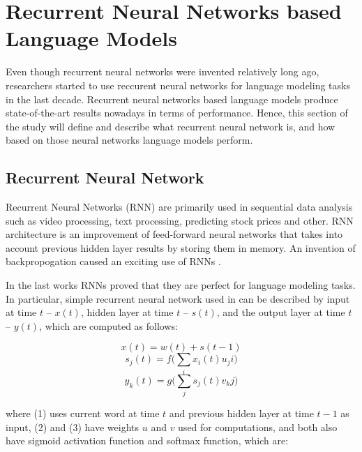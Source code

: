 \documentclass{IEEEtran}
\begin{document}
\section{Recurrent Neural Networks based Language Models}

Even though recurrent neural networks were invented relatively long ago, researchers started to use reccurent neural networks for language modeling tasks in the last decade. Recurrent neural networks based language models produce state-of-the-art results nowadays in terms of performance. Hence, this section of the study will define and describe what recurrent neural network is, and how based on those neural networks language models perform.

\subsection{Recurrent Neural Network}

Recurrent Neural Networks (RNN) are primarily used in sequential data analysis such as video processing, text processing, predicting stock prices and other. RNN architecture is an improvement of feed-forward neural networks that takes into account previous hidden layer results by storing them in memory. An invention of backpropogation caused an exciting use of RNNs \cite{deeplearning}.

In the last works \cite{Mikolov2010NeuralLM, Mikolov2011ExtensionsOR, Zaremba2014LSTM} RNNs proved that they are perfect for language modeling tasks. In particular, simple recurrent neural network used in \cite{Mikolov2010NeuralLM} can be described by input at time \(t\) -- \(x(t)\), hidden layer at time \(t\) -- \(s(t)\), and the output layer at time \(t\) -- \(y(t)\), which are computed as follows:

\begin{equation}
	x(t) = w(t) + s(t-1)
\end{equation}
\begin{equation}
	s_j(t) = f\Bigg(\sum_i{x_i(t)u_ji}\Bigg)
\end{equation}
\begin{equation}
	y_k(t) = g\Bigg(\sum_j{s_j(t) v_kj}\Bigg)
\end{equation}

where (1) uses current word at time \(t\) and previous hidden layer at time \(t-1\) as input, (2) and (3) have weights \(u\) and \(v\) used for computations, and both also have sigmoid activation function and softmax function, which are:
\end{document}
